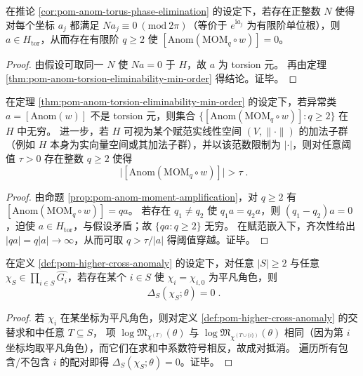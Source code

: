 \begin{corollary}\label{cor:pom-anom-cyclotomic-phase-torsion}
在推论 \ref{cor:pom-anom-torus-phase-elimination} 的设定下，若存在正整数 \(N\) 使得对每个坐标 \(a_j\) 都满足 \(N a_j\equiv 0\ (\mathrm{mod}\ 2\pi)\)（等价于 \(e^{\mathrm{i}a_j}\) 为有限阶单位根），则 \(a\in H_{\mathrm{tor}}\)，从而存在有限阶 \(q\ge 2\) 使 \([\mathrm{Anom}(\mathrm{MOM}_q\circ w)]=0\)。
\end{corollary}
\begin{proof}
由假设可取同一 \(N\) 使 \(Na=0\) 于 \(H\)，故 \(a\) 为 torsion 元。
再由定理 \ref{thm:pom-anom-torsion-eliminability-min-order} 得结论。证毕。
\end{proof}

\begin{corollary}\label{cor:pom-anom-unbounded-amplification}
在定理 \ref{thm:pom-anom-torsion-eliminability-min-order} 的设定下，若异常类 \(a=[\mathrm{Anom}(w)]\) 不是 torsion 元，则集合
\(
\{[\mathrm{Anom}(\mathrm{MOM}_q\circ w)]:q\ge 2\}
\)
在 \(H\) 中无穷。
进一步，若 \(H\) 可视为某个赋范实线性空间 \((V,\|\cdot\|)\) 的加法子群（例如 \(H\) 本身为实向量空间或其加法子群），并以该范数限制为 \(|\cdot|\)，则对任意阈值 \(\tau>0\) 存在整数 \(q\ge 2\) 使得
\[
\boxed{\;
\bigl|[\mathrm{Anom}(\mathrm{MOM}_q\circ w)]\bigr|>\tau\; }.
\]
\end{corollary}
\begin{proof}
由命题 \ref{prop:pom-anom-moment-amplification}，对 \(q\ge 2\) 有
\(
[\mathrm{Anom}(\mathrm{MOM}_q\circ w)]=qa
\)。
若存在 \(q_1\neq q_2\) 使 \(q_1a=q_2a\)，则 \((q_1-q_2)a=0\)，迫使 \(a\in H_{\mathrm{tor}}\)，与假设矛盾；故 \(\{qa:q\ge 2\}\) 无穷。
在赋范嵌入下，齐次性给出 \(|qa|=q|a|\to\infty\)，从而可取 \(q>\tau/|a|\) 得阈值穿越。证毕。
\end{proof}

\begin{proposition}\label{prop:pom-cross-anom-support-constraint}
在定义 \ref{def:pom-higher-cross-anomaly} 的设定下，对任意 \(|S|\ge 2\) 与任意 \(\chi_S\in\prod_{i\in S}\widehat{G_i}\)，若存在某个 \(i\in S\) 使 \(\chi_i=\chi_{i,0}\) 为平凡角色，则
\[
\boxed{\;
\Delta_S(\chi_S;\theta)=0\; }.
\]
\end{proposition}
\begin{proof}
若 \(\chi_i\) 在某坐标为平凡角色，则对定义 \ref{def:pom-higher-cross-anomaly} 的交替求和中任意 \(T\subseteq S\)，
项 \(\log\mathfrak{M}_{\chi^{(T)}}(\theta)\) 与 \(\log\mathfrak{M}_{\chi^{(T\cup\{i\})}}(\theta)\) 相同（因为第 \(i\) 坐标均取平凡角色），而它们在求和中系数符号相反，故成对抵消。
遍历所有包含/不包含 \(i\) 的配对即得 \(\Delta_S(\chi_S;\theta)=0\)。证毕。
\end{proof}

